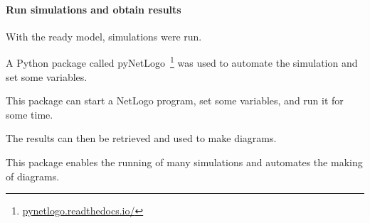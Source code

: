 \paragraph{Run simulations and obtain results}

With the ready model, simulations were run.

A Python package called pyNetLogo~\footnote{\url{pynetlogo.readthedocs.io/}} was used to automate the simulation and set some variables.

This package can start a NetLogo program, set some variables, and run it for some time.

The results can then be retrieved and used to make diagrams.

This package enables the running of many simulations and automates the making of diagrams.




















